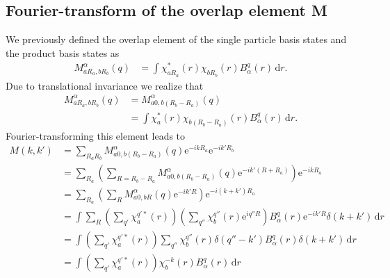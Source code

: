 \documentclass[12pt,a4paper]{scrartcl}
\numberwithin{equation}{section}
\begin{document}
\subsection{Fourier-transform of the overlap element M}
We previously defined the overlap element of the single particle
basis states and the product basis states as
\begin{align}
 M^{\alpha}_{aR_a,bR_b}(q)
 &= \int \chi^*_{aR_a}(r) \chi_{bR_b}(r) B^{q}_{\alpha}(r) \, \mathrm{d}r.
\end{align}
Due to translational invariance we realize that
\begin{align}
 M^{\alpha}_{aR_a,bR_b}(q)
 &= M^{\alpha}_{a0,b(R_b-R_a)}(q) \\
 &= \int \chi^*_{a}(r) \chi_{b(R_b-R_a)}(r) B^{q}_{\alpha}(r) \, \mathrm{d}r.
\end{align}
Fourier-transforming this element leads to
\begin{align}
M(k,k')
&= \sum_{R_aR_b} M^{\alpha}_{a0,b(R_b-R_a)}(q) \mathrm{e}^{-i k R_a}\mathrm{e}^{-i k' R_b} \\
&= \sum_{R_a}\left(
           \sum_{R=R_b-R_a} M^{\alpha}_{a0,b(R_b-R_a)}(q) \mathrm{e}^{-i k' (R+R_a)} 
            \right) \mathrm{e}^{-i k R_a} \\
&= \sum_{R_a}\left(
           \sum_{R} M^{\alpha}_{a0,bR}(q) \mathrm{e}^{-i k' R} 
            \right) \mathrm{e}^{-i (k+k') R_a} \\
&=  \int \sum_{R} \left(\sum_{q'} \chi^{q'*}_{a}(r) \right)
          \left( \sum_{q''} \chi^{q''}_{b}(r) \mathrm{e}^{i q'' R} \right)
           B^{q}_{\alpha}(r) \mathrm{e}^{-i k' R} \delta(k+k') \, \mathrm{d}r \\
%
&= \int \left(\sum_{q'} \chi^{q'*}_{a}(r) \right)
           \sum_{q''} \chi^{q''}_{b}(r) \delta(q''-k')
           B^{q}_{\alpha}(r)  \delta(k+k') \, \mathrm{d}r \\
%
&= \int \left(\sum_{q'} \chi^{q'*}_{a}(r) \right)
           \chi^{-k}_{b}(r)
           B^{q}_{\alpha}(r)  \, \mathrm{d}r
\end{align}


\clearpage 

\end{document}
